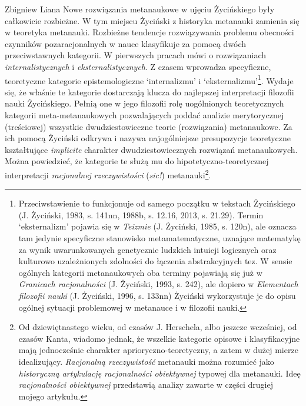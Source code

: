 \begin{artplenv}{Zbigniew Liana}
Nowe rozwiązania metanaukowe w ujęciu Życińskiego były całkowicie rozbieżne. W tym miejscu Życiński z historyka
metanauki zamienia się w teoretyka metanauki. Rozbieżne tendencje rozwiązywania problemu obecności czynników
pozaracjonalnych w nauce klasyfikuje za pomocą dwóch przeciwstawnych kategorii. W pierwszych pracach mówi o
rozwiązaniach\textit{ internalistycznych} i \textit{eksternalistycznych}. Z czasem wprowadza specyficzne, teoretyczne
kategorie epistemologiczne ‘internalizmu’ i ‘eksternalizmu’\footnote{Przeciwstawienie to funkcjonuje od samego początku
	w tekstach Życińskiego \label{ref:RNDhYHdk6Gn9I}(J. Życiński, 1983, s. 141nn, 1988b, s. 12.16, 2013, s. 21.29). Termin
	‘eksternalizm’ pojawia się w \textit{Teizmie} \label{ref:RNDqnijmYbBgM}(J. Życiński, 1985, s. 120n), ale oznacza tam
	jedynie specyficzne stanowisko metamatematyczne, uznające matematykę za wynik uwarunkowanych genetycznie ludzkich
	intuicji logicznych oraz kulturowo uzależnionych zdolności do łączenia abstrakcyjnych tez. W sensie ogólnych kategorii
	metanaukowych oba terminy pojawiają się już w \textit{Granicach racjonalności} \label{ref:RND37pLqxd4Aa}(J. Życiński,
	1993, s. 242), ale dopiero w \textit{Elementach filozofii nauki} \label{ref:RNDY1V0zunmmK}(J. Życiński, 1996, s. 133nn)
	Życiński wykorzystuje je do opisu ogólnej sytuacji problemowej w metanauce i w filozofii nauki.}. Wydaje się, że
właśnie te kategorie dostarczają klucza do najlepszej interpretacji filozofii nauki Życińskiego. Pełnią one w jego
filozofii rolę uogólnionych teoretycznych kategorii meta-metanaukowych pozwalających poddać analizie merytorycznej
(treściowej) wszystkie dwudziestowieczne teorie (rozwiązania) metanaukowe. Za ich pomocą Życiński odkrywa i nazywa
najogólniejsze presupozycje teoretyczne kształtujące \textit{implicite} charakter dwudziestowiecznych rozwiązań
metanaukowych. Można powiedzieć, że kategorie te służą mu do hipotetyczno-teoretycznej interpretacji \textit{racjonalnej}
\textit{rzeczywistości} (\textit{sic!}) metanauki\footnote{Od dziewiętnastego wieku, od czasów J. Herschela, albo jeszcze
	wcześniej, od czasów Kanta, wiadomo jednak, że wszelkie kategorie opisowe i klasyfikacyjne mają jednocześnie charakter
	aprioryczno-teoretyczny, a zatem w dużej mierze idealizujący. \textit{Racjonalną rzeczywistość }metanauki można rozumieć
	jako \textit{historyczną artykulację racjonalności obiektywnej} typowej dla metanauki. Ideę \textit{racjonalności
		obiektywnej} przedstawią analizy zawarte w części drugiej mojego artykułu.}.


\end{artplenv}
